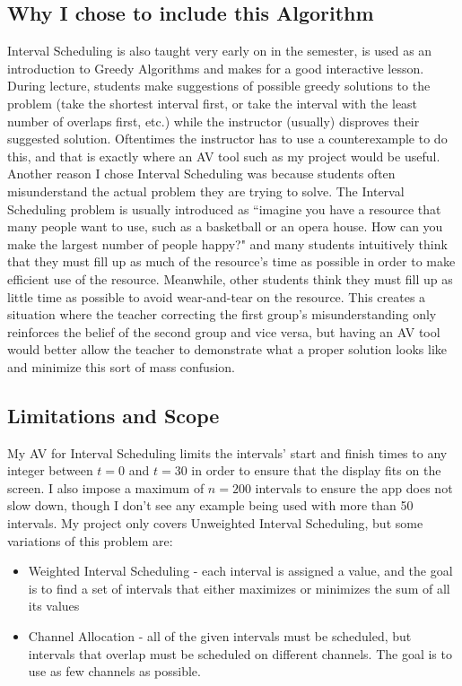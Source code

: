 \subsection{Why I chose to include this Algorithm}
\hspace{-0.26in}
Interval Scheduling is also taught very early on in the semester,
is used as an introduction to Greedy Algorithms and makes for 
a good interactive lesson. 
During lecture, students make suggestions of possible greedy solutions
to the problem
(take the shortest interval first, or 
take the  interval with the least number of overlaps first, etc.)
while the instructor (usually) disproves their suggested solution. 
Oftentimes the instructor has to use a counterexample to do this,
and that is exactly where an AV tool such as my project would be useful.
\newline\newline
Another reason I chose Interval Scheduling was because students often 
misunderstand the actual problem they are trying to solve.
The Interval Scheduling problem is usually introduced as 
``imagine you have a resource that many people want to use, 
such as  a basketball or an opera house. 
How can you make the largest number of people happy?"
and many students intuitively think that they must fill up
as much of the resource's time as possible 
in order to make efficient use of the resource.
Meanwhile, other students think they must fill up as little time as possible
to avoid wear-and-tear on the resource. 
This creates a situation where the teacher correcting the first group's
misunderstanding only reinforces the belief of the second group and vice versa,
but having an AV tool would better allow the teacher to demonstrate 
what a proper solution looks like and minimize this sort of mass confusion.
\subsection{Limitations and Scope}
\hspace{-0.26in}
My AV for Interval Scheduling limits the intervals' start and finish times to 
any integer between $t=0$ and $t=30$
in order to ensure that the display fits on the screen. 
I also impose a maximum of $n = 200$ intervals
to ensure the app does not slow down, though I don't see any 
example being used with more than 50 intervals. 
\newline\newline
My project only covers Unweighted Interval Scheduling, but
some variations of this problem are: 
\begin{itemize}
	\item Weighted Interval Scheduling - 
		each interval is assigned a value, 
		and the goal is to find a set of intervals that 
		either maximizes or minimizes the sum of all its values
	\item Channel Allocation - 
		all of the given intervals must be scheduled, 
		but intervals that overlap must be scheduled on different channels. 
		The goal is to use as few channels as possible. 
\end{itemize}
